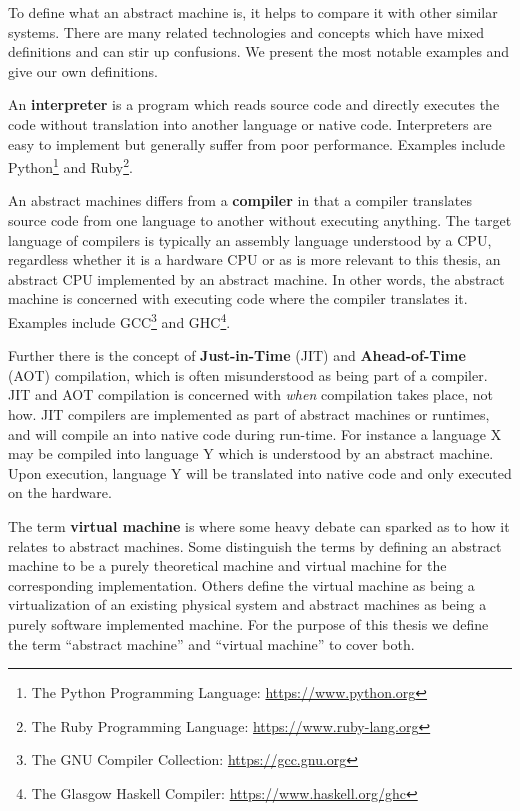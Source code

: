 To define what an abstract machine is, it helps to compare it with other similar
systems. There are many related technologies and concepts which have mixed
definitions and can stir up confusions. We present the most notable examples and
give our own definitions.

An \textbf{interpreter} is a program which reads source code and directly
executes the code without translation into another language or native
code. Interpreters are easy to implement but generally suffer from poor
performance\cite{NEEDED}. Examples include Python\footnote{The Python
  Programming Language: \url{https://www.python.org}} and Ruby\footnote{The
  Ruby Programming Language: \url{https://www.ruby-lang.org}}.

An abstract machines differs from a \textbf{compiler} in that a compiler
translates source code from one language to another without executing
anything. The target language of compilers is typically an assembly language
understood by a CPU, regardless whether it is a hardware CPU or as is more
relevant to this thesis, an abstract CPU implemented by an abstract machine. In
other words, the abstract machine is concerned with executing code where the
compiler translates it. Examples include GCC\footnote{The GNU Compiler
  Collection: \url{https://gcc.gnu.org}} and GHC\footnote{The Glasgow Haskell
  Compiler: \url{https://www.haskell.org/ghc}}.

Further there is the concept of \textbf{Just-in-Time} (JIT) and
\textbf{Ahead-of-Time} (AOT) compilation, which is often misunderstood as being
part of a compiler. JIT and AOT compilation is concerned with \textit{when}
compilation takes place, not how. JIT compilers are implemented as part of
abstract machines or runtimes, and will compile an  into native code during run-time. For instance a language X
may be compiled into language Y which is understood by an abstract machine. Upon
execution, language Y will be translated into native code and only executed on
the hardware.

The term \textbf{virtual machine} is where some heavy debate can sparked as to
how it relates to abstract machines. Some distinguish the terms by defining an
abstract machine to be a purely theoretical machine and virtual machine for the
corresponding implementation. Others define the virtual machine as being a
virtualization of an existing physical system and abstract machines as being a
purely software implemented machine. For the purpose of this thesis we define
the term ``abstract machine'' and ``virtual machine'' to cover both.

